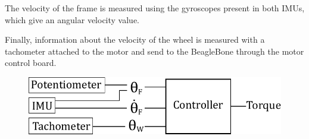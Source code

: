 The velocity of the frame is measured using the gyroscopes present in both IMUs, which give an angular velocity value.

Finally, information about the velocity of the wheel is measured with a tachometer attached to the motor and send to the BeagleBone through the motor control board. 
\\
\begin{figure}[H]\vspace{-4mm}
	\centering
	\includegraphics[scale=.75]{figures/measurements}
	\label{fig:measurements}
\end{figure}\vspace{-5mm}
